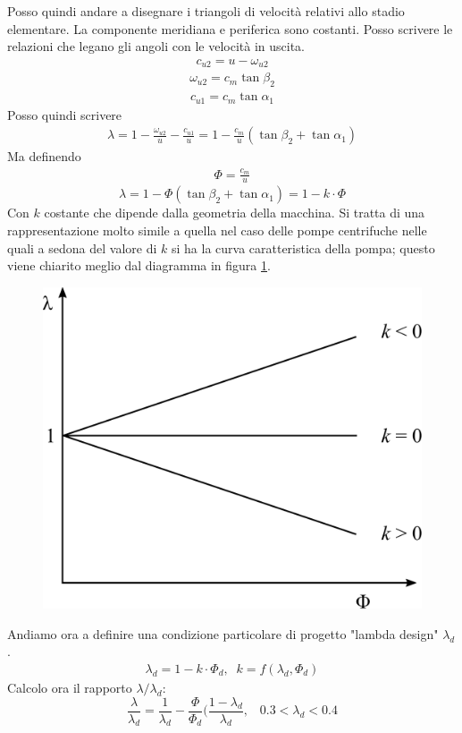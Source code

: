 Posso quindi andare a disegnare i triangoli di velocità relativi allo stadio elementare. La componente meridiana e periferica sono costanti. Posso scrivere le relazioni che legano gli angoli con le velocità in uscita. 
\begin{align*}
c_{u2} = u - \omega_{u2}
\end{align*}
\begin{align*}
\omega_{u2} = c_m \tan \beta_2
\end{align*}
\begin{align*}
c_{u1} = c_m \tan \alpha_1
\end{align*}
Posso quindi scrivere
\begin{align*}
\lambda = 1- \frac{\omega_{u2}}{u} - \frac{c_{u1}}{u} = 1 - \frac{c_m}{u} \left(\tan \beta_2 + \tan \alpha_1 \right)
\end{align*}
Ma definendo 
\begin{align*}
\Phi = \frac{c_m}{u}
\end{align*}
\begin{equation}
\lambda = 1 - \Phi \left( \tan \beta_2 + \tan \alpha_1 \right) = 1 - k \cdot \Phi
\end{equation}
Con $k$ costante che dipende dalla geometria della macchina. Si tratta di una rappresentazione molto simile a quella nel caso delle pompe centrifuche nelle quali a sedona del valore di $k$ si ha la curva caratteristica della pompa; questo viene chiarito meglio dal diagramma in figura \ref{fig:CondProg}.
\begin{figure}
\centering
  \includegraphics[width=.4\textwidth]{fig/CondProg.pdf}
\caption{}
\label{fig:CondProg}
\end{figure}
Andiamo ora a definire una condizione particolare di progetto "lambda design" $\lambda_d$.
\begin{align*}
\lambda_d = 1 - k \cdot \Phi_d, \;\; k = f(\lambda_d,\Phi_d)
\end{align*}
Calcolo ora il rapporto $\lambda/\lambda_d$:
\begin{equation} \label{eq:lambdad}
\frac{\lambda}{\lambda_d} = \frac{1}{\lambda_d} - \frac{\Phi}{\Phi_d} \Bigg( \frac{1-\lambda_d}{\lambda_d}, \;\;\; 0.3 < \lambda_d < 0.4
\end{equation}
